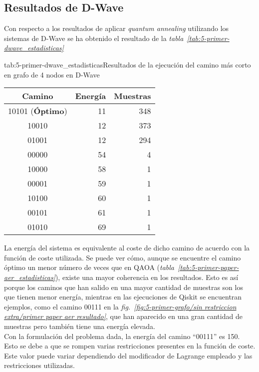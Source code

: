 \subsection{Resultados de D-Wave}

Con respecto a los resultados de aplicar \textit{quantum annealing} utilizando los sistemas de D-Wave se ha obtenido el resultado de la \textit{tabla~\ref{tab:5-primer-dwave_estadisticas}}

\begin{table}[Resultados D-Wave {--} artículo de Urgelles \textit{et al.} (2022)]{tab:5-primer-dwave_estadisticas}{Resultados de la ejecución del camino más corto en grafo de 4 nodos en D-Wave}
  \centering
  \begin{tabular}{|c|r|r|}
    \hline
    \textbf{Camino}         & \textbf{Energía} & \textbf{Muestras} \\ \hline
    10101 (\textbf{Óptimo}) & 11               & 348               \\ \hline
    10010                   & 12               & 373               \\ \hline
    01001                   & 12               & 294               \\ \hline
    00000                   & 54               &   4               \\ \hline
    10000                   & 58               &   1               \\ \hline
    00001                   & 59               &   1               \\ \hline
    10100                   & 60               &   1               \\ \hline
    00101                   & 61               &   1               \\ \hline
    01010                   & 69               &   1               \\ \hline
  \end{tabular}
\end{table}

La energía del sistema es equivalente al coste de dicho camino de acuerdo con la función de coste utilizada.
Se puede ver cómo, aunque se encuentre el camino óptimo un menor número de veces que en QAOA (\textit{tabla~\ref{tab:5-primer-paper-aer_estadisticas}}), existe una mayor coherencia en los resultados.
Esto es así porque los caminos que han salido en una mayor cantidad de muestras son los que tienen menor energía, mientras en las ejecuciones de Qiskit se encuentran ejemplos, como el camino 00111 en la
\textit{fig.~\ref{fig:5-primer-grafo/sin restriccion extra/primer paper aer resultado}}, que han aparecido en una gran cantidad de muestras pero también tiene una energía elevada.
\\
Con la formulación del problema dada, la energía del camino ``00111'' es 150.
Esto se debe a que se rompen varias restricciones presentes en la función de coste.
Este valor puede variar dependiendo del modificador de Lagrange empleado y las restricciones utilizadas.

